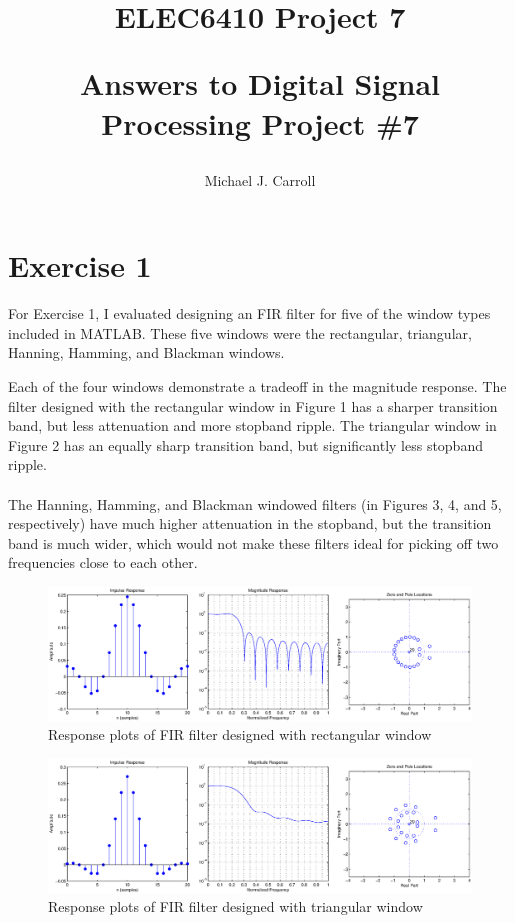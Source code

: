\documentclass{article}
\title{ELEC6410 Project 7\\
 {\large \begin{par}
Answers to Digital Signal Processing Project \#7
\end{par}
}}
\author{Michael J. Carroll}
\begin{document}
\maketitle
           
\section*{Exercise 1}
\begin{par}
For Exercise 1, I evaluated designing an FIR filter for five of the window types included in MATLAB.  These five windows were the rectangular, triangular, Hanning, Hamming, and Blackman windows.\\
\end{par}

\begin{par}
Each of the four windows demonstrate a tradeoff in the magnitude response.  The filter designed with the rectangular window in Figure 1 has a sharper transition band, but less attenuation and more stopband ripple.  The triangular window in Figure 2 has an equally sharp transition band, but significantly less stopband ripple.\\
\\
The Hanning, Hamming, and Blackman windowed filters (in Figures 3, 4, and 5, respectively) have much higher attenuation in the stopband, but the transition band is much wider, which would not make these filters ideal for picking off two frequencies close to each other.
\end{par}
\begin{figure}[htbp]
\centering
\includegraphics[width=6in]{project7_01.eps}
\caption{Response plots of FIR filter designed with rectangular window}
\label{fig:figure1}
\end{figure}

\begin{figure}[htbp]
\centering
\includegraphics[width=6in]{project7_02.eps}
\caption{Response plots of FIR filter designed with triangular window}
\label{fig:figure2}
\end{figure}
\end{document}

